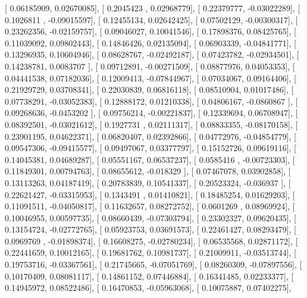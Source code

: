 \documentclass{article}
\begin{document}
       [ 0.06185909,  0.02670085],
       [ 0.2045423 ,  0.02968779],
       [ 0.22379777, -0.03022289],
       [ 0.1026811 , -0.09015597],
       [ 0.12455134,  0.02642425],
       [ 0.07502129, -0.00300317],
       [ 0.23262356, -0.02159757],
       [ 0.09046027,  0.10041546],
       [ 0.17898376,  0.08425765],
       [ 0.11039092,  0.09802443],
       [ 0.14846426,  0.02135094],
       [ 0.06903339, -0.04841771],
       [ 0.13296935,  0.10604946],
       [ 0.08628767, -0.02492187],
       [ 0.07423782, -0.02934501],
       [ 0.14238781,  0.0083707 ],
       [ 0.09712891, -0.00271509],
       [ 0.08877976,  0.04053353],
       [ 0.04441538,  0.07182036],
       [ 0.12009413, -0.07844967],
       [ 0.07034067,  0.09164406],
       [ 0.21929729,  0.03708341],
       [ 0.22030839,  0.06816118],
       [ 0.08510904,  0.01017486],
       [ 0.07738291, -0.03052383],
       [ 0.12888172,  0.01210338],
       [ 0.04806167, -0.0860867 ],
       [ 0.09268636, -0.0453202 ],
       [ 0.09756214, -0.00221837],
       [ 0.12339694,  0.06708947],
       [ 0.08392501, -0.03021612],
       [ 0.1927731 ,  0.02111317],
       [ 0.08833355, -0.08170158],
       [ 0.23901195,  0.04622371],
       [ 0.06820407,  0.02392866],
       [ 0.04772976, -0.04854779],
       [ 0.09547306, -0.09415577],
       [ 0.09497067,  0.03377797],
       [ 0.15152726,  0.09619116],
       [ 0.14045381,  0.04689287],
       [ 0.05551167,  0.06537237],
       [ 0.0585416 , -0.00723303],
       [ 0.11849301,  0.00794763],
       [ 0.08655612, -0.018329  ],
       [ 0.07467078,  0.03902858],
       [ 0.13113263,  0.04187419],
       [ 0.20783839,  0.10541337],
       [ 0.20523324, -0.036937  ],
       [ 0.22621427, -0.03315953],
       [ 0.1343491 ,  0.01410821],
       [ 0.18485254,  0.01629203],
       [ 0.11091511, -0.04050817],
       [ 0.11632657,  0.08272752],
       [ 0.0601269 ,  0.08969924],
       [ 0.10046955,  0.00597735],
       [ 0.08660439, -0.07303794],
       [ 0.23302327,  0.09620435],
       [ 0.13154724, -0.02772765],
       [ 0.05923753,  0.03691573],
       [ 0.22461427,  0.08293479],
       [ 0.0969769 , -0.01898374],
       [ 0.16608275, -0.02780234],
       [ 0.06535568,  0.02871172],
       [ 0.22441659,  0.10012165],
       [ 0.19681762,  0.10981737],
       [ 0.21009911, -0.03513744],
       [ 0.19753716, -0.03367561],
       [ 0.21745665, -0.07051769],
       [ 0.08260309, -0.07897556],
       [ 0.10170409,  0.08081117],
       [ 0.14861152,  0.07446884],
       [ 0.16341485,  0.02233377],
       [ 0.14945972,  0.08522486],
       [ 0.16470853, -0.05963068],
       [ 0.10075887,  0.07402275],
\end{document}
